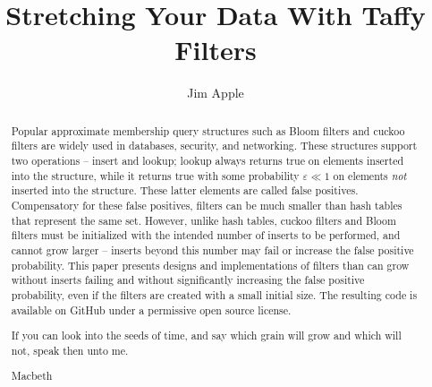\documentclass[letterpaper,twocolumn,10pt]{article}
\begin{document}
\title{Stretching Your Data With Taffy Filters}
\ifanon
\else
\author{Jim Apple}
\fi






\maketitle

\begin{abstract}
Popular approximate membership query structures such as Bloom filters and cuckoo filters are widely used in databases, security, and networking.
These structures support two operations -- insert and lookup; lookup always returns true on elements inserted into the structure, while it returns true with some probability $\varepsilon \ll 1$ on elements {\em not} inserted into the structure.
These latter elements are called false positives.
Compensatory for these false positives, filters can be much smaller than hash tables that represent the same set.
However, unlike hash tables, cuckoo filters and Bloom filters must be initialized with the intended number of inserts to be performed, and cannot grow larger --
inserts beyond this number may fail or increase the false positive probability.
This paper presents designs and implementations of filters than can grow without inserts failing and without significantly increasing the false positive probability, even if the filters are created with a small initial size.
The resulting code is available on GitHub under a permissive open source license.
\ifepigraph
\epigraph{If you can look into the seeds of time, and say which grain will grow and which will not, speak then unto me.}{Macbeth}
\fi
\end{abstract}
\end{document}
